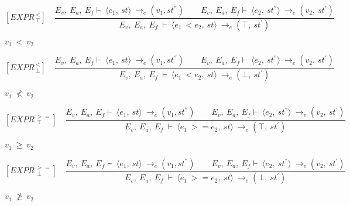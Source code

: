 	
	
	
	
	\[	
	[EXPR^{\ <}_{\ \top}] \quad	
	\dfrac{E_v, \ E_a, \ E_f \vdash \ \langle e_1, \ st \rangle \ \rightarrow_e (v_1, st^{''}) \qquad E_v, \ E_a, \ E_f \vdash \ \langle e_2, \ st^{''} \rangle \ \rightarrow_e (v_2, \ st^{'})}{E_v, \ E_a, \ E_f \ \vdash \ \langle e_1 \ < e_2, \ st \rangle \ \rightarrow_e (\top, \ st^{'})}
	\]
	
	
	\begin{math}		
		v_1 \ < \ v_2		
	\end{math} 
	
	
	
	
	
	
	
	
	\[	
	[EXPR^{\ <}_{\ \bot}] \quad	
	\dfrac{E_v, \ E_a, \ E_f \vdash \ \langle e_1, \ st \rangle \ \rightarrow_e (v_1, st^{''}) \qquad E_v, \ E_a, \ E_f \vdash \ \langle e_2, \ st^{''} \rangle \ \rightarrow_e (v_2, \ st^{'})}{E_v, \ E_a, \ E_f \ \vdash \ \langle e_1 \ < e_2, \ st \rangle \ \rightarrow_e (\bot, \ st^{'})}	
	\]
	
	
	\begin{math}		
		v_1 \ \not< \ v_2		
	\end{math}
	
	
	
	
	
	\[	
	[EXPR^{\ >=}_{\ \ \top}] \quad	
	\dfrac{E_v, \ E_a, \ E_f \vdash \ \langle e_1, \ st \rangle \ \rightarrow_e (v_1, st^{''}) \qquad E_v, \ E_a, \ E_f \vdash \ \langle e_2, \ st^{''} \rangle \ \rightarrow_e (v_2, \ st^{'})}{E_v, \ E_a, \ E_f \ \vdash \ \langle e_1 \ >= e_2, \ st \rangle \ \rightarrow_e (\top, \ st^{'})}	
	\]
	
	
	\begin{math}		
		v_1 \ \ge \ v_2		
	\end{math} 
	
	
	
	
	
	
	
	
	\[	
	[EXPR^{\ >=}_{\ \ \bot}] \quad	
	\dfrac{E_v, \ E_a, \ E_f \vdash \ \langle e_1, \ st \rangle \ \rightarrow_e (v_1, st^{''}) \qquad E_v, \ E_a, \ E_f \vdash \ \langle e_2, \ st^{''} \rangle \ \rightarrow_e (v_2, \ st^{'})}{E_v, \ E_a, \ E_f \ \vdash \ \langle e_1 \ >= e_2, \ st \rangle \ \rightarrow_e (\bot, \ st^{'})}	
	\]
	
	
	\begin{math}		
		v_1 \ \ngeq \ v_2		
	\end{math}
	
